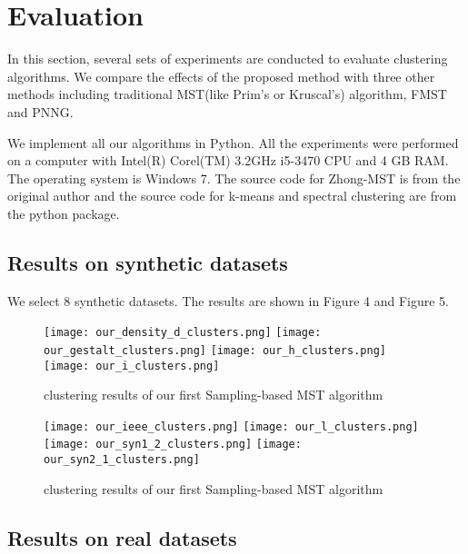 \section{Evaluation}
	In this section, several sets of experiments are conducted to evaluate clustering algorithms. We compare the effects of the proposed method with three other methods including traditional MST(like Prim's or Kruscal's) algorithm, FMST\cite{zhong2015} and PNNG\cite{Jothi2018}. 

	We implement all our algorithms in Python. All the experiments were performed on a computer with Intel(R) Corel(TM) 3.2GHz i5-3470 CPU and 4 GB RAM. The operating system is Windows 7. The source code for Zhong-MST is from the original author and the source code for k-means and spectral clustering are from the python package.
	\subsection{Results on synthetic datasets}
		We select 8 synthetic datasets. The results are shown in Figure 4 and Figure 5.
	
		\begin{figure}[!t]
	        \centering
	        \texttt{[image: our\_density\_d\_clusters.png]}
	        \texttt{[image: our\_gestalt\_clusters.png]}
	        \texttt{[image: our\_h\_clusters.png]}
	        \texttt{[image: our\_i\_clusters.png]}
	        \caption{clustering results of our first Sampling-based MST algorithm}
	    \end{figure}

	    \begin{figure}[!t]
	        \centering
	        \texttt{[image: our\_ieee\_clusters.png]}
	        \texttt{[image: our\_l\_clusters.png]}
	        \texttt{[image: our\_syn1\_2\_clusters.png]}
	        \texttt{[image: our\_syn2\_1\_clusters.png]}
	        \caption{clustering results of our first Sampling-based MST algorithm}
	    \end{figure}

	\subsection{Results on real datasets}
		